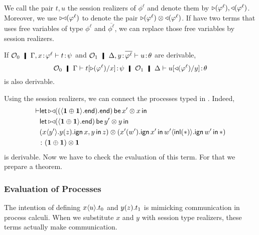       We call the pair $t,u$ the session realizers of $\phi^\ell$ and
      denote them by $\mathop\triangleright(\varphi^\ell), \mathop\triangleleft(\varphi^\ell)$.
      Moreover, we use $\mathop{\triangleright\triangleleft}(\varphi^\ell)$ to denote the pair
      $\mathop\triangleright(\varphi^\ell)\otimes\mathop\triangleleft(\varphi^\ell)$.
      If have two terms that uses free variables of type $\phi^\ell$ and
      $\overline{\phi^\ell}$,
      we can replace those free variables by session realizers.
       \begin{corollary}
	If
	$\hypert_0\hmid \G,\tj{x}{\phi^\ell}\tr\tj{t}{\psi}$ and
	$\hypert_1\hmid \D,\tj{y}{\overline{\phi^\ell}}\tr\tj{u}{\theta}$
	are derivable,
	\[
	\hypert_0\hmid \G\tr\tj{t[\leftside{\phi^\ell}/ x]}{\psi}
	\hmid \hypert_1\hmid \D\tr\tj{u[\rightside{\phi^\ell}/ y]}{\theta}
	\]
	is also derivable.
       \end{corollary}
	\begin{example}
	 Using the session realizers, we can connect the processes typed
	 in .  Indeed,
	 \begin{align*}
	  \vdash &
	  \mathsf{let}\,{\mathop{\triangleright\triangleleft}((\langle{\mathbf{1}\oplus\mathbf{1}}\rangle.{\mathsf{end}}).{\mathsf{end}})}\,\mathsf
	  { be }\,{x'\otimes
	 x}\,\mathsf{ in }\,\\ &
	 \mathsf{let}\,{\mathop{\triangleright\triangleleft}(\langle{\mathbf{1}\oplus\mathbf{1}}\rangle.{\mathsf{end}})}\,\mathsf{be}\,{y'\otimes
	  y}\,\mathsf{in}\,\\ & {\left(
	 {x}\langle{y'}\rangle.{{{y}({z}).{\mathsf{ign }\,{x,y}\,\mathsf{ in }\,{z}}}}
	 \right)}
	 \otimes
	  \left(
	 {{x'}({w'}).{\mathsf{ign }\,{x'}\,\mathsf{ in }\,{{w'}\langle{\mathsf{inl}({\ast})}\rangle.{\mathsf{ign }\,{w'}\,\mathsf{ in }\,{\ast}}}}}
	  \right)
	  \\&
	 \colon{(\mathbf{1}\oplus\mathbf{1})\otimes\mathbf{1}}
	 \end{align*}
	 is derivable.
	 Now we have to check the evaluation of this term.
	 For that we prepare a theorem.
	\end{example}


      \subsubsection{Evaluation of Processes}

      The intention of defining ${x}\langle{u}\rangle.{t_0}$ and ${{y}({z}).{t_1}}$
      is mimicking communication in process calculi.
      When we substitute $x$ and $y$ with session type realizers,
      these terms actually make communication.

